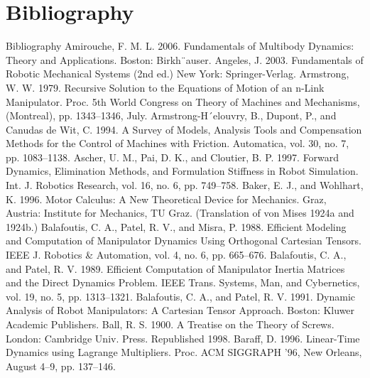 \chapter*{Bibliography}
Bibliography Amirouche, F. M. L. 2006. Fundamentals of Multibody Dynamics: Theory and Applications. Boston: Birkh¨auser. Angeles, J. 2003. Fundamentals of Robotic Mechanical Systems (2nd ed.) New York: Springer-Verlag. Armstrong, W. W. 1979. Recursive Solution to the Equations of Motion of an n-Link Manipulator. Proc. 5th World Congress on Theory of Machines and Mechanisms, (Montreal), pp. 1343–1346, July. Armstrong-H´elouvry, B., Dupont, P., and Canudas de Wit, C. 1994. A Survey of Models, Analysis Tools and Compensation Methods for the Control of Machines with Friction. Automatica, vol. 30, no. 7, pp. 1083–1138. Ascher, U. M., Pai, D. K., and Cloutier, B. P. 1997. Forward Dynamics, Elimination Methods, and Formulation Stiffness in Robot Simulation. Int. J. Robotics Research, vol. 16, no. 6, pp. 749–758. Baker, E. J., and Wohlhart, K. 1996. Motor Calculus: A New Theoretical Device for Mechanics. Graz, Austria: Institute for Mechanics, TU Graz. (Translation of von Mises 1924a and 1924b.) Balafoutis, C. A., Patel, R. V., and Misra, P. 1988. Efficient Modeling and Computation of Manipulator Dynamics Using Orthogonal Cartesian Tensors. IEEE J. Robotics \& Automation, vol. 4, no. 6, pp. 665–676. Balafoutis, C. A., and Patel, R. V. 1989. Efficient Computation of Manipulator Inertia Matrices and the Direct Dynamics Problem. IEEE Trans. Systems, Man, and Cybernetics, vol. 19, no. 5, pp. 1313–1321. Balafoutis, C. A., and Patel, R. V. 1991. Dynamic Analysis of Robot Manipulators: A Cartesian Tensor Approach. Boston: Kluwer Academic Publishers. Ball, R. S. 1900. A Treatise on the Theory of Screws. London: Cambridge Univ. Press. Republished 1998. Baraff, D. 1996. Linear-Time Dynamics using Lagrange Multipliers. Proc. ACM SIGGRAPH ’96, New Orleans, August 4–9, pp. 137–146.


